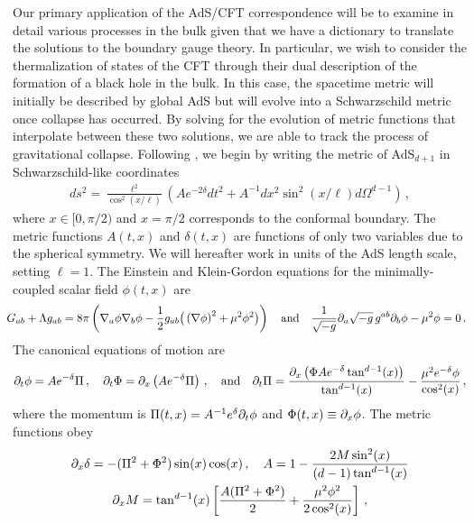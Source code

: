 \documentclass[../PhD.tex]{subfiles}
\begin{document}
Our primary application of the AdS/CFT correspondence will be to examine in detail various processes in the bulk given that we have a dictionary to translate the solutions to the boundary gauge theory. In particular, we wish to consider the thermalization of states of the CFT through their dual description of the formation of a black hole in the bulk. In this case, the spacetime metric will initially be described by global AdS but will evolve into a Schwarzschild metric once collapse has occurred. By solving for the evolution of metric functions that interpolate between these two solutions, we are able to track the process of gravitational collapse. Following \cite{1508.02709}, we begin by writing the metric of AdS$_{d+1}$ in Schwarzschild-like coordinates 
\begin{align}
ds^2 = \frac{\ell^2}{\cos^2 \left(x / \ell \right)} \left( A e^{-2\delta} dt^2 + A^{-1}dx^2 \sin^2 \left(x / \ell \right) d\Omega^{d-1} \right) \, ,
\end{align}
where $x \in [0, \pi/2)$ and $x = \pi / 2$ corresponds to the conformal boundary. The metric functions $A(t,x)$ and $\delta(t,x)$ are functions of only two variables due to the spherical symmetry. We will hereafter work in units of the AdS length scale, setting $\ell = 1$. The Einstein and Klein-Gordon equations for the minimally-coupled scalar field $\phi(t,x)$ are
\begin{align}
\!\!\!\! G_{ab} + \Lambda g_{ab} = 8\pi \left( \nabla_a \phi \nabla_b \phi - \frac{1}{2} g_{ab} \big( \left( \nabla \phi \right)^2 + \mu^2 \phi^2 \big) \right) \quad \text{and} \quad \frac{1}{\sqrt{-g}} \partial_a \sqrt{-g} \, g^{ab} \partial_b \phi - \mu^2 \phi = 0 \, .
\end{align}
The canonical equations of motion are \cite{1210.1566}
\begin{align}
\label{canon eqns}
\partial_t \phi = A e^{-\delta} \Pi \, , \quad \partial_t \Phi = \partial_x \left( A e^{-\delta} \Pi \right) \, , \quad \text{and} \quad \partial_t \Pi = \frac{\partial_x \left( \Phi A e^{-\delta} \tan^{d-1} (x) \right)}{\tan^{d-1}(x)} - \frac{\mu^2 e^{-\delta} \phi}{\cos^2 (x)} \, ,
\end{align}
where the momentum is $\Pi(t,x) = A^{-1} e^{\delta} \partial_t \phi$ and $\Phi(t,x) \equiv \partial_x \phi$. The metric functions obey
\begin{align}
\label{metric funcs}
\begin{gathered}
\partial_x \delta = - (\Pi^2 + \Phi^2 ) \sin (x) \cos(x) \, , \quad A = 1 - \frac{2M \sin^2 (x) }{(d-1) \tan^{d-1}(x)} \\
\partial_x M = \tan^{d-1}(x) \left[ \frac{A (\Pi^2 + \Phi^2)}{2} + \frac{\mu^2 \phi^2}{2 \cos^2 (x)} \right] \, ,
\end{gathered}
\end{align}
\end{document}
